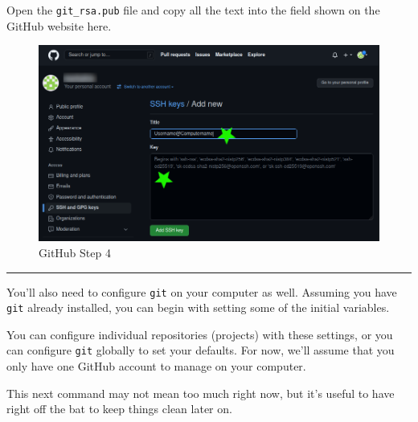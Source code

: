 Open the \texttt{git\_rsa.pub} file and copy all the text into the field
shown on the GitHub website here.

\begin{figure}
\centering
\includegraphics{Images/GH_04.png}
\caption{GitHub Step 4}
\end{figure}
\FloatBarrier

\begin{center}\rule{0.5\linewidth}{0.5pt}\end{center}

You'll also need to configure \texttt{git} on your computer as well.
Assuming you have \texttt{git} already installed, you can begin with
setting some of the initial variables.

You can configure individual repositories (projects) with these
settings, or you can configure \texttt{git} globally to set your
defaults. For now, we'll assume that you only have one GitHub account to
manage on your computer.

\begin{Shaded}
\begin{Highlighting}[]
\end{Highlighting}
\end{Shaded}

This next command may not mean too much right now, but it's useful to
have right off the bat to keep things clean later on.

\begin{Shaded}
\begin{Highlighting}[]
\end{Highlighting}
\end{Shaded}

